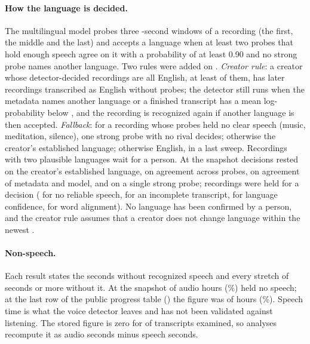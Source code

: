 \documentclass[letterpaper]{article} %
\begin{document}
\paragraph{How the language is decided.} The multilingual model probes three \WindowSeconds-second windows of a recording (the first, the middle and the last) and accepts a language when at least two probes that hold enough speech agree on it with a probability of at least 0.90 and no strong probe names another language. Two rules were added on \SnapDate. \emph{Creator rule}: a creator whose detector-decided recordings are all English, at least \CreatorRuleMinDecisions{} of them, has later recordings transcribed as English without probes; the detector still runs when the metadata names another language or a finished transcript has a mean log-probability below \SecondLookLogp, and the recording is recognized again if another language is then accepted. \emph{Fallback}: for a recording whose probes held no clear speech (music, meditation, silence), one strong probe with no rival decides; otherwise the creator's established language; otherwise English, in a last sweep. Recordings with two plausible languages wait for a person. At the snapshot \LangBasisCreator{} decisions rested on the creator's established language, \LangBasisProbes{} on agreement across probes, \LangBasisMetadata{} on agreement of metadata and model, and \LangBasisSingleProbe{} on a single strong probe; \SnapHeld{} recordings were held for a decision (\HeldNoSpeech{} for no reliable speech, \HeldIncomplete{} for an incomplete transcript, \HeldLanguage{} for language confidence, \HeldAlignment{} for word alignment). No language has been confirmed by a person, and the creator rule assumes that a creator does not change language within the newest \NPerCreator.

\paragraph{Non-speech.} Each result states the seconds without recognized speech and every stretch of \QuietStretchSeconds{} seconds or more without it. At the snapshot \SnapNonSpeechHours{} of \SnapHours{} audio hours (\SnapNonSpeechPct\%) held no speech; at the last row of the public progress table (\ProgStamp) the figure was \ProgNonSpeechHours{} of \ProgHours{} hours (\ProgNonSpeechPct\%). Speech time is what the voice detector leaves and has not been validated against listening. The stored figure is zero for \ZeroNonSpeech{} of \ArtBase{} transcripts examined, so analyses recompute it as audio seconds minus speech seconds.
\end{document}
